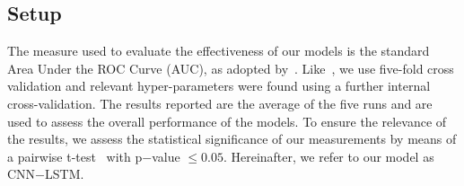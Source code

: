 \subsection{Setup}

The measure used to evaluate the effectiveness of our models is the standard Area Under the ROC Curve (AUC), as adopted by~\citet{kdd}. Like~\citet{bayes}, we use five-fold cross validation and relevant hyper-parameters were found using a further internal cross-validation. The results reported are the average of the five runs and are used to assess the overall performance of the models. To ensure the relevance of the results, we assess the statistical significance of our measurements by means of a pairwise t-test~\citep{t-test} with p$-$value $\le 0.05$. Hereinafter, we refer to our model as CNN$-$LSTM.